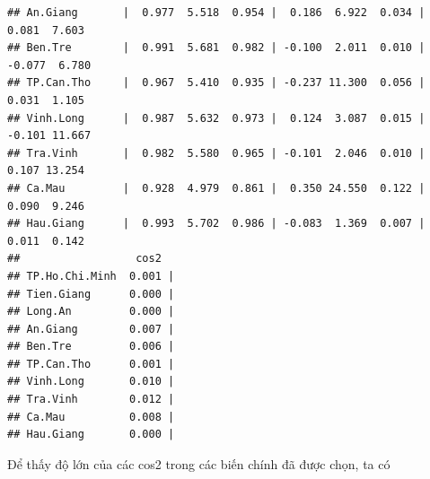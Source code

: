 \documentclass[../thesis.tex]{subfiles}
\begin{document}
\begin{verbatim}
## An.Giang       |  0.977  5.518  0.954 |  0.186  6.922  0.034 |  0.081  7.603
## Ben.Tre        |  0.991  5.681  0.982 | -0.100  2.011  0.010 | -0.077  6.780
## TP.Can.Tho     |  0.967  5.410  0.935 | -0.237 11.300  0.056 |  0.031  1.105
## Vinh.Long      |  0.987  5.632  0.973 |  0.124  3.087  0.015 | -0.101 11.667
## Tra.Vinh       |  0.982  5.580  0.965 | -0.101  2.046  0.010 |  0.107 13.254
## Ca.Mau         |  0.928  4.979  0.861 |  0.350 24.550  0.122 |  0.090  9.246
## Hau.Giang      |  0.993  5.702  0.986 | -0.083  1.369  0.007 |  0.011  0.142
##                  cos2  
## TP.Ho.Chi.Minh  0.001 |
## Tien.Giang      0.000 |
## Long.An         0.000 |
## An.Giang        0.007 |
## Ben.Tre         0.006 |
## TP.Can.Tho      0.001 |
## Vinh.Long       0.010 |
## Tra.Vinh        0.012 |
## Ca.Mau          0.008 |
## Hau.Giang       0.000 |
\end{verbatim}


\newpage
Để thấy độ lớn của các cos2 trong các biến chính đã được chọn, ta có
\begin{Shaded}
	\begin{Highlighting}[]
\OtherTok{\textless{}{-}}\SpecialCharTok{\%\textgreater{}\%}\SpecialCharTok{::}\NormalTok{()}
		\SpecialCharTok{$} \NormalTok{)}
\OtherTok{\textless{}{-}}\SpecialCharTok{\%\textgreater{}\%}\SpecialCharTok{::}\NormalTok{()}
		\SpecialCharTok{$} \NormalTok{)}
	\end{Highlighting}
\end{Shaded}
\end{document}
